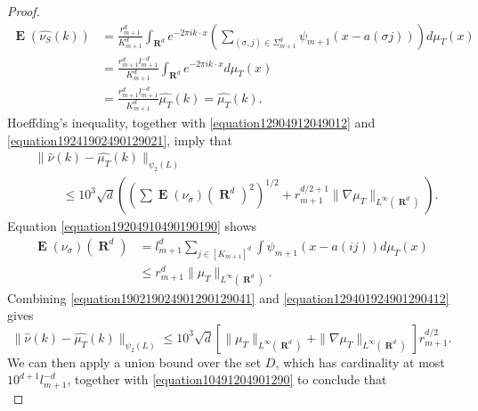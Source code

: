 \documentclass[12pt,reqno]{article}
\numberwithin{equation}{section}
\DeclareMathOperator{\RR}{\mathbf{R}}
\DeclareMathOperator{\EE}{\mathbf{E}}
\newcommand{\psitwo}[1]{\| {#1} \|_{\psi_2(L)}}
\begin{document}
\begin{proof}
    \begin{equation} \label{equation19241902490129021}
    \begin{split}
        \EE(\widehat{\nu_S}(k)) &= \frac{r_{m+1}^d}{K_{m+1}^d} \int_{\RR^d} e^{-2 \pi i k \cdot x} \left( \sum_{(\sigma ,j) \in \Sigma_{m+1}^d} \psi_{m+1}(x - a(\sigma j)) \right) d\mu_T(x)\\
        &= \frac{r_{m+1}^d l_{m+1}^{-d}}{K_{m+1}^d} \int_{\RR^d} e^{-2 \pi i k \cdot x} d\mu_T(x)\\
        &= \frac{r_{m+1}^d l_{m+1}^{-d}}{K_{m+1}^d} \widehat{\mu_T}(k) = \widehat{\mu_T}(k).
    \end{split}
    \end{equation}
    Hoeffding's inequality, together with \eqref{equation12904912049012} and \eqref{equation19241902490129021}, imply that
    \begin{equation} \label{equation190219024901290129041}
    \begin{split}
        & \psitwo{\widehat{\nu}(k) - \widehat{\mu_T}(k)}\\
        &\ \ \ \ \ \ \ \ \ \ \leq 10^3 \sqrt{d} \left( \left( \sum \EE(\nu_\sigma)(\RR^d)^2 \right)^{1/2} + r_{m+1}^{d/2+1} \| \nabla \mu_T \|_{L^\infty(\RR^d)} \right).
    \end{split}
    \end{equation}
    Equation \eqref{equation19204910490190190} shows
    \begin{equation} \label{equation129401924901290412}
    \begin{split}
        \EE(\nu_\sigma)(\RR^d) &= l_{m+1}^d \sum_{j \in [K_{m+1}]^d} \int \psi_{m+1}(x - a(ij)) d\mu_T(x)\\
        &\leq r_{m+1}^d \| \mu_T \|_{L^\infty(\RR^d)}.
    \end{split}
    \end{equation}
    Combining \eqref{equation190219024901290129041} and \eqref{equation129401924901290412} gives
    \begin{equation} \label{equation10491204901290}
        \psitwo{\widehat{\nu}(k) - \widehat{\mu_T}(k)} \leq 10^3 \sqrt{d} \left[ \| \mu_T \|_{L^\infty(\RR^d)} + \| \nabla \mu_T \|_{L^\infty(\RR^d)} \right] r_{m+1}^{d/2}.
    \end{equation}
    We can then apply a union bound over the set $D$, which has cardinality at most $10^{d+1} l_{m+1}^{-d}$, together with \eqref{equation10491204901290} to conclude that
    \begin{equation} \label{equation1290421941021290}

\end{equation}
\end{proof}
\end{document}
